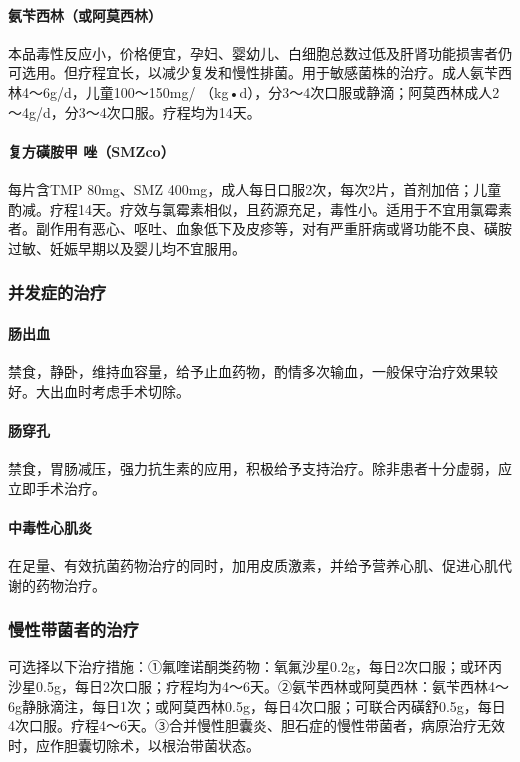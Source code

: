 \paragraph{氨苄西林（或阿莫西林）}

本品毒性反应小，价格便宜，孕妇、婴幼儿、白细胞总数过低及肝肾功能损害者仍可选用。但疗程宜长，以减少复发和慢性排菌。用于敏感菌株的治疗。成人氨苄西林4～6g/d，儿童100～150mg/
（kg•d），分3～4次口服或静滴；阿莫西林成人2～4g/d，分3～4次口服。疗程均为14天。

\paragraph{复方磺胺甲 {} 唑（SMZco）}

每片含TMP 80mg、SMZ
400mg，成人每日口服2次，每次2片，首剂加倍；儿童酌减。疗程14天。疗效与氯霉素相似，且药源充足，毒性小。适用于不宜用氯霉素者。副作用有恶心、呕吐、血象低下及皮疹等，对有严重肝病或肾功能不良、磺胺过敏、妊娠早期以及婴儿均不宜服用。

\subsubsection{并发症的治疗}

\paragraph{肠出血}

禁食，静卧，维持血容量，给予止血药物，酌情多次输血，一般保守治疗效果较好。大出血时考虑手术切除。

\paragraph{肠穿孔}

禁食，胃肠减压，强力抗生素的应用，积极给予支持治疗。除非患者十分虚弱，应立即手术治疗。

\paragraph{中毒性心肌炎}

在足量、有效抗菌药物治疗的同时，加用皮质激素，并给予营养心肌、促进心肌代谢的药物治疗。

\subsubsection{慢性带菌者的治疗}

可选择以下治疗措施：①氟喹诺酮类药物：氧氟沙星0.2g，每日2次口服；或环丙沙星0.5g，每日2次口服；疗程均为4～6天。②氨苄西林或阿莫西林：氨苄西林4～6g静脉滴注，每日1次；或阿莫西林0.5g，每日4次口服；可联合丙磺舒0.5g，每日4次口服。疗程4～6天。③合并慢性胆囊炎、胆石症的慢性带菌者，病原治疗无效时，应作胆囊切除术，以根治带菌状态。

